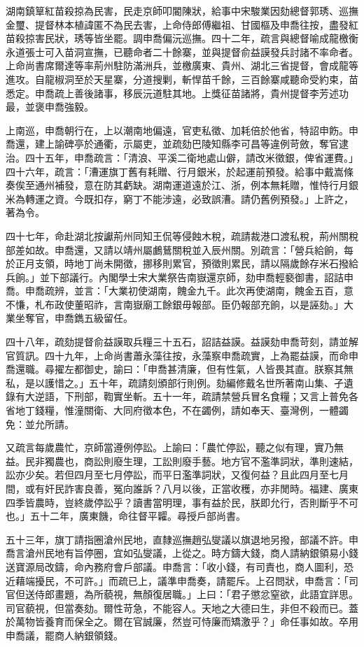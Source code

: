 \begin{pinyinscope}
湖南鎮筸紅苗殺掠為民害，民走京師叩閽陳狀，給事中宋駿業因劾總督郭琇、巡撫金璽、提督林本植諱匿不為民去害，上命侍郎傅繼祖、甘國樞及申喬往按，盡發紅苗殺掠害民狀，琇等皆坐罷。調申喬偏沅巡撫。四十二年，疏言與總督喻成龍檄衡永道張士可入苗洞宣撫，已聽命者二十餘寨，並與提督俞益謨發兵討諸不率命者。上命尚書席爾達等率荊州駐防滿洲兵，並檄廣東、貴州、湖北三省提督，會成龍等進攻。自龍椒洞至於天星寨，分道搜剿，斬悍苗千餘，三百餘寨咸聽命受約束，苗悉定。申喬疏上善後諸事，移辰沅道駐其地。上獎征苗諸將，貴州提督李芳述功最，並褒申喬強毅。

上南巡，申喬朝行在，上以潮南地偏遠，官吏私徵、加耗倍於他省，特詔申飭。申喬還，建上諭碑亭於通衢，示屬吏，並疏劾巴陵知縣李可昌等違例苛斂，奪官逮治。四十五年，申喬疏言：「清浪、平溪二衛地處山僻，請改米徵銀，俾省運費。」四十六年，疏言：「漕運旗丁舊有耗贈、行月銀米，於起運前預發。給事中戴嵩條奏俟至通州補發，意在防其虧缺。湖南運道遠於江、浙，例本無耗贈，惟恃行月銀米為轉運之資。今既扣存，窮丁不能涉遠，必致誤漕。請仍舊例預發。」上許之，著為令。

四十七年，命赴湖北按讞荊州同知王侃等侵蝕木稅，疏請裁港口渡私稅，荊州關稅部差如故。申喬還，又請以靖州屬鸕鶿關稅並入辰州關。別疏言：「營兵給餉，每於正月支領，時地丁尚未開徵，挪移則累官，預徵則累民，請以隔歲餘存米石撥給兵餉。」並下部議行。內閣學士宋大業祭告南嶽還京師，劾申喬輕褻御書，詔詰申喬。申喬疏辨，並言：「大業初使湖南，餽金九千。此次再使湖南，餽金五百，意不慊，札布政使董昭祚，言南嶽廟工餘銀毋報部。臣仍報部充餉，以是誣劾。」大業坐奪官，申喬鐫五級留任。

四十八年，疏劾提督俞益謨取兵糧三十五石，詔詰益謨。益謨劾申喬苛刻，請並解官質訊。四十九年，上命尚書蕭永藻往按，永藻察申喬疏實，上為罷益謨，而命申喬還職。尋擢左都御史，諭曰：「申喬甚清廉，但有性氣，人皆畏其直。朕察其無私，是以護惜之。」五十年，疏請刻頒部行則例。劾編修戴名世所著南山集、孑遺錄有大逆語，下刑部，鞫實坐斬。五十一年，疏請禁營兵冒名食糧；又言上普免各省地丁錢糧，惟潼關衛、大同府徵本色，不在蠲例，請如奉天、臺灣例，一體蠲免：並允所請。

又疏言每歲農忙，京師當遵例停訟。上諭曰：「農忙停訟，聽之似有理，實乃無益。民非獨農也，商訟則廢生理，工訟則廢手藝。地方官不濫準詞狀，準則速結，訟亦少矣。若但四月至七月停訟，而平日濫準詞狀，又復何益？且此四月至七月間，或有奸民詐害良善，冤向誰訴？八月以後，正當收穫，亦非閒時。福建、廣東四季皆農時，豈終歲停訟乎？讀書當明理，事有益於民，朕即允行，否則斷乎不可也。」五十二年，廣東饑，命往督平糶。尋授戶部尚書。

五十三年，旗丁請指圈滄州民地，直隸巡撫趙弘燮議以旗退地另撥，部議不許。申喬言滄州民地有旨停圈，宜如弘燮議，上從之。時方鑄大錢，商人請納銀領易小錢送寶源局改鑄，命內務府會戶部議。申喬言：「收小錢，有司責也，商人圖利，恐近藉端擾民，不可許。」而疏已上，議準申喬奏，請罷斥。上召問狀，申喬言：「司官但送侍郎畫題，為所藐視，無顏復居職。」上曰：「君子懲忿窒欲，此語宜詳思。司官藐視，但當奏劾。爾性苛急，不能容人。天地之大德曰生，非但不殺而已。蓋於萬物皆養育而保全之。爾在官誠廉，然豈可恃廉而矯激乎？」命任事如故。卒用申喬議，罷商人納銀領錢。


\end{pinyinscope}
